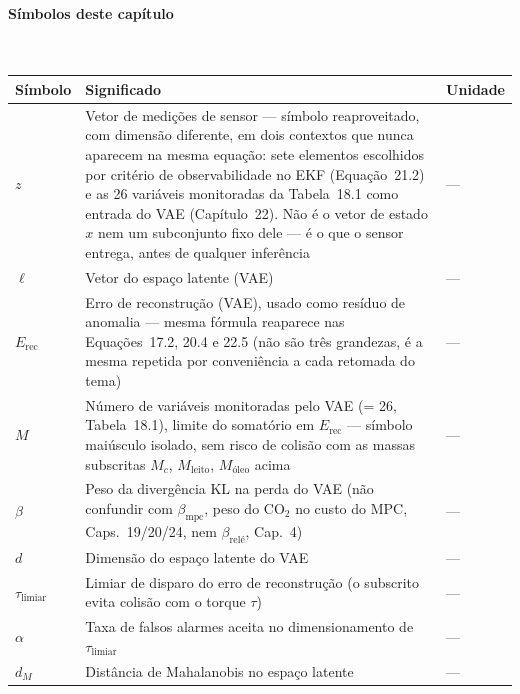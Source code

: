 \documentclass[12pt,a4paper]{article}
\numberwithin{equation}{section}
\numberwithin{table}{section}
\numberwithin{figure}{section}
\begin{document}
\paragraph{Símbolos deste capítulo}\mbox{}\\[-0.5em]
{\small
\begin{longtable}{>{\raggedright\arraybackslash}p{2.6cm} >{\raggedright\arraybackslash}p{9.2cm} >{\raggedright\arraybackslash}p{2.6cm}}
	\toprule
	\textbf{Símbolo} & \textbf{Significado} & \textbf{Unidade} \\ \midrule
	\endhead
	$z$ & Vetor de medições de sensor — símbolo reaproveitado, com dimensão diferente, em dois contextos que nunca aparecem na mesma equação: sete elementos escolhidos por critério de observabilidade no EKF (Equação~21.2) e as 26 variáveis monitoradas da Tabela~18.1 como entrada do VAE (Capítulo~22). Não é o vetor de estado $x$ nem um subconjunto fixo dele — é o que o sensor entrega, antes de qualquer inferência & --- \\
	$\ell$\dag & Vetor do espaço latente (VAE) & --- \\
	$E_{\text{rec}}$ & Erro de reconstrução (VAE), usado como resíduo de anomalia — mesma fórmula reaparece nas Equações~17.2, 20.4 e 22.5 (não são três grandezas, é a mesma repetida por conveniência a cada retomada do tema) & --- \\
	$M$ & Número de variáveis monitoradas pelo VAE (= 26, Tabela~18.1), limite do somatório em $E_{\text{rec}}$ — símbolo maiúsculo isolado, sem risco de colisão com as massas subscritas $M_c$, $M_{\text{leito}}$, $M_{\text{óleo}}$ acima & --- \\
	$\beta$ & Peso da divergência KL na perda do VAE (não confundir com $\beta_{\text{mpc}}$, peso do CO$_2$ no custo do MPC, Caps.~19/20/24, nem $\beta_{\text{relé}}$, Cap.~4) & --- \\
	$d$ & Dimensão do espaço latente do VAE & --- \\
	$\tau_{\text{limiar}}$\dag & Limiar de disparo do erro de reconstrução (o subscrito evita colisão com o torque $\tau$) & --- \\
	$\alpha$ & Taxa de falsos alarmes aceita no dimensionamento de $\tau_{\text{limiar}}$ & --- \\
	$d_M$ & Distância de Mahalanobis no espaço latente & --- \\
	\bottomrule
\end{longtable}
}
\end{document}
